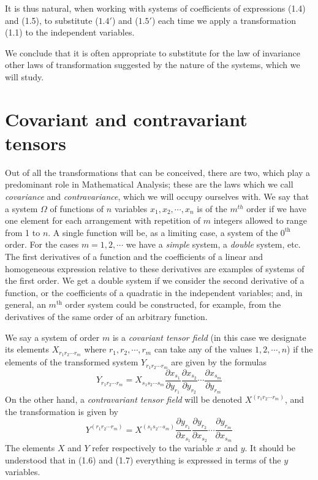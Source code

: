 \documentclass{book}
\begin{document}
It is thus natural, when working with systems of coefficients of expressions (1.4) and (1.5), to substitute ($1.4'$) and ($1.5'$) each time we apply a transformation (1.1) to the independent variables.

We conclude that it is often appropriate to substitute for the law of invariance other laws of transformation suggested by the nature of the systems, which we will study.
\section{Covariant and contravariant tensors}
Out of all the transformations that can be conceived, there are two, which play a predominant role in Mathematical Analysis; these are the laws which we call \emph{covariance} and \emph{contravariance}, which we will occupy ourselves with. We say that a system $\Omega$ of functions of $n$ variables $x_1,x_2,\cdots,x_n$ is of the $m^{th}$ order if we have one element for each arrangement with repetition of $m$ integers allowed to range from 1 to $n$. A single function will be, as a limiting case, a system of the $0^{\text{th}}$ order. For the cases $m=1,2,\cdots$ we have a \emph{simple} system, a \emph{double} system, etc. The first derivatives of a function and the coefficients of a linear and homogeneous expression relative to these derivatives are examples of systems of the first order. We get a double system if we consider the second derivative of a function, or the coefficients of a quadratic in the independent variables; and, in general, an $m^{\text{th}}$ order system could be constructed, for example, from the derivatives of the same order of an arbitrary function.

We say a system of order $m$ is a \emph{covariant tensor field} (in this case we designate its elements $X_{r_1r_2\cdots r_m}$ where $r_1,r_2,\cdots,r_m$ can take any of the values $1,2,\cdots,n$) if the elements of the transformed system $Y_{r_1r_2\cdots r_m}$ are given by the formulas
\begin{equation}
Y_{r_1r_2\cdots r_m}=X_{s_1s_2\cdots s_m}\frac{\partial x_{s_1}}{\partial y_{r_1}}\frac{\partial x_{s_2}}{\partial y_{r_2}}\cdots\frac{\partial x_{s_m}}{\partial y_{r_m}}
\end{equation}
On the other hand, a \emph{contravariant tensor field} will be denoted $X^{(r_1r_2\cdots r_m)}$, and the transformation is given by
\begin{equation}
Y^{(r_1r_2\cdots r_m)}=X^{(s_1s_2\cdots s_m)}\frac{\partial y_{r_1}}{\partial x_{s_1}}\frac{\partial y_{r_2}}{\partial x_{s_2}}\cdots\frac{\partial y_{r_m}}{\partial x_{s_m}}
\end{equation}
The elements $X$ and $Y$ refer respectively to the variable $x$ and $y$. It should be understood that in (1.6) and (1.7) everything is expressed in terms of the $y$ variables.
\end{document}
